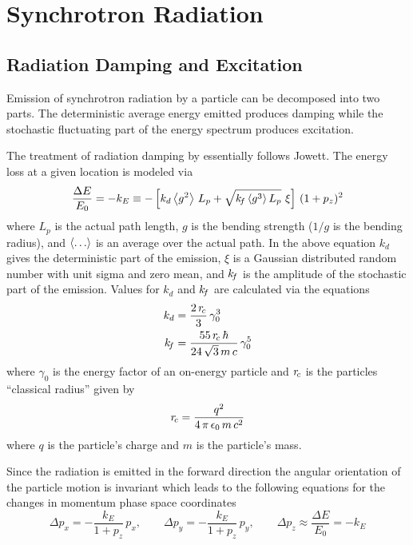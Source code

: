 \chapter{Synchrotron Radiation}

\section{Radiation Damping and Excitation}
\label{s:radiation}

Emission of synchrotron radiation by a particle can be decomposed into two parts. The deterministic
average energy emitted produces damping while the stochastic fluctuating part of the energy spectrum
produces excitation\cite{b:jowett}.

The treatment of radiation damping by \bmad essentially follows Jowett\cite{b:jowett}. The energy
loss at a given location is modeled via
\begin{equation}
  \frac{\Delta E}{E_0} = 
  -k_E \equiv -\left[ k_d \left\langle g^2 \right\rangle \, L_p + \sqrt{k_{\mkern-3 mu{f}} \left\langle g^3 \right\rangle L_p} \,\, \xi \right] \, (1 + p_z)^2
  \label{deekk}
\end{equation}
where $L_p$ is the actual path length, $g$ is the bending strength ($1/g$ is the bending radius),
and $\left\langle \ldots \right\rangle$ is an average over the actual path.  In the above equation $k_d$ gives the
deterministic part of the emission, $\xi$ is a Gaussian distributed random number with unit sigma
and zero mean, and $k_{\mkern-3 mu{f}}$ is the amplitude of the stochastic part of the emission. Values for $k_d$
and $k_{\mkern-3 mu{f}}$ are calculated via the equations
\begin{align}
  k_d &= \frac{2 \, r_{\!c}}{3} \, \gamma_0^3
    \label{k2r3g} \\
  k_{\mkern-3 mu{f}} &= \frac{55 \, r_{\!c} \, \hbar}{24 \, \sqrt{3} \, m \, c} \, \gamma_0^5
    \label{k55rh}
\end{align}
where $\gamma_0$ is the energy factor of an on-energy particle and $r_{\!c}$ is the particles
``classical radius'' given by
\begin{equation}
  r_{\!c} = \frac{q^2}{4 \, \pi \, \epsilon_0 \, m \, c^2} 
  \label{rq4pe}
\end{equation}
where $q$ is the particle's charge and $m$ is the particle's mass.

Since the radiation is emitted in the forward direction the angular orientation of the particle
motion is invariant which leads to the following equations for the changes in momentum phase space
coordinates
\begin{equation}
  \Delta p_x = -\frac{k_E}{1 + p_z} \, p_x , \qquad
  \Delta p_y = -\frac{k_E}{1 + p_z} \, p_y, \qquad
  \Delta p_z \approx \frac{\Delta E}{E_0} = -k_E 
  \label{pk1pp}
\end{equation}

